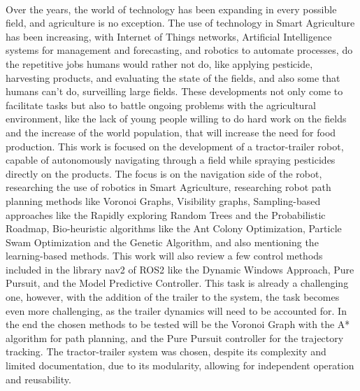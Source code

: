 
%

\paragraph{}Over the years, the world of technology has been expanding in every possible field, 
and agriculture is no exception. The use of technology in Smart Agriculture has been increasing, with 
Internet of Things networks, Artificial Intelligence systems for management and forecasting, and robotics to 
automate processes, do the repetitive jobs humans would rather not do, like applying pesticide, 
harvesting products, and evaluating the state of the fields, and also some that humans can't do, 
surveilling large fields. These developments not only come to facilitate tasks but also to battle ongoing problems 
with the agricultural environment, like the lack of young people willing to do hard work on the fields 
and the increase of the world population, that will increase the need for food production. 
This work is focused on the development of 
a tractor-trailer robot, capable of autonomously navigating through a field while spraying pesticides 
directly on the products. The focus is on the navigation side of the robot, researching the use of 
robotics in Smart Agriculture, researching robot path planning methods like Voronoi Graphs, Visibility graphs, Sampling-based approaches like 
the Rapidly exploring Random Trees and the Probabilistic Roadmap, 
Bio-heuristic algorithms like the Ant Colony Optimization, Particle Swam Optimization and the Genetic Algorithm, and also mentioning the learning-based methods. 
This work will also review a few control methods included in the library nav2 of ROS2 like the Dynamic Windows Approach,
 Pure Pursuit, and the Model Predictive Controller. This task is already a challenging one, however, with the addition of the trailer 
 to the system, the task becomes even more challenging, as the trailer dynamics will need to be accounted 
for. In the end the chosen methods to be tested will be the Voronoi Graph with the A* algorithm for path 
planning, and the Pure Pursuit controller for the trajectory tracking.
The tractor-trailer system was chosen, despite its complexity and limited documentation, 
due to its modularity, allowing for independent operation and reusability.

